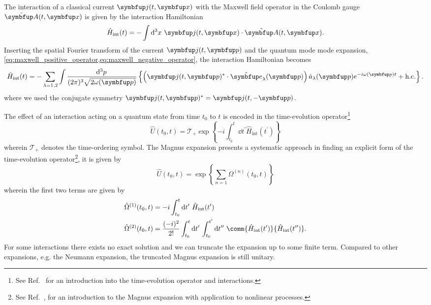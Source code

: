 The interaction of a classical current $\vb{j}(t,\vb{x})$ with the Maxwell field operator in the Coulomb gauge $\vu{A}(t,\vb{x})$ is given by the interaction Hamiltonian
\begin{equation}
	\hat{H}_\text{int}(t)
	=
	-
	\int\dd[3]{x}
	\vb{j}(t,\vb{x})
	\vdot
	\hat{\vb{A}}(t,\vb{x})
	.
\end{equation}
Inserting the spatial Fourier transform of the current $\vb{j}(t,\vb{p})$ and the quantum mode mode expansion, \cref{eq:maxwell_positive_operator,eq:maxwell_negative_operator}, the interaction Hamiltonian becomes
\begin{equation}
	\hat{H}_\text{int}(t)
	=
	-
	\sum_{\lambda=1,2}
	\int\frac{\dd[3]{p}}{(2\pi)^3\sqrt{2\omega(\vb{p})}}
	\left\{
		\left(
			\vb{j}(t,\vb{p})^*
			\vdot
			\vu{e}_\lambda(\vb{p})
		\right)
		\hat{a}_\lambda(\vb{p})
		e^{-i\omega(\vb{p})t}
		+
		\text{h.c.}
	\right\}
	\label{eq:classical_current_interaction}
	.
\end{equation}
where we used the conjugate symmetry $\vb{j}(t,\vb{p})^*=\vb{j}(t,-\vb{p})$.

The effect of an interaction acting on a quantum state from time $t_0$ to $t$ is encoded in the time-evolution operator\footnote{See Ref.~\cite[p.~215]{Greiner2013} for an introduction into the time-evolution operator and interactions.}
\begin{equation}
	\hat{U}(t_0,t)
	=
	\mathcal{T}_+
	\exp\left\{
		-i
		\int_{t_0}^t\dd{t^\prime}
		\hat{H}_\text{int}(t^\prime)
	\right\}
	\label{eq:time_evolution_operator}
\end{equation}
wherein $\mathcal{T}_+$ denotes the time-ordering symbol.
The Magnus expansion presents a systematic approach in finding an explicit form of the time-evolution operator\footnote{See Ref.~\cite[p.~42]{QuesadaMejia2015}, for an introduction to the Magnus expansion with application to nonlinear processes.}, it is given by
\begin{equation}
	\hat{U}(t_0,t)
	=
	\exp\left\{
		\sum_{n=1}
		\Omega^{(n)}(t_0,t)
	\right\}
\end{equation}
wherein the first two terms are given by
\begin{align}
	\hat{\Omega}^{(1)}(t_0,t)
	&=
	-i
	\int_{t_0}^t\dd{t^\prime}
	\hat{H}_\text{int}(t^\prime)
	\\
	\hat{\Omega}^{(2)}(t_0,t)
	&=
	\frac{(-i)^2}{2!}
	\int_{t_0}^t\dd{t^\prime}
	\int_{t_0}^{t^\prime}\dd{t^{\prime\prime}}
	\comm{\hat{H}_\text{int}(t^\prime)}{\hat{H}_\text{int}(t^{\prime\prime})}
	.
\end{align}
For some interactions there exists no exact solution and we can truncate the expansion up to some finite term.
Compared to other expansions, e.g. the Neumann expansion, the truncated Magnus expansion is still unitary.

